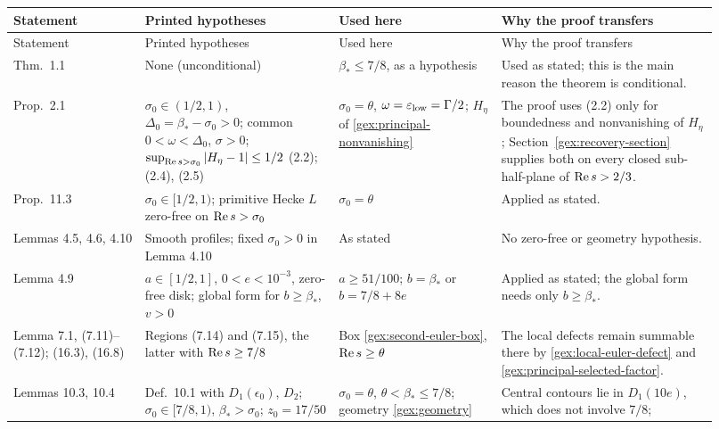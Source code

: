 {\footnotesize
\begin{longtable}{@{}>{\raggedright\arraybackslash}p{0.17\linewidth}
                   >{\raggedright\arraybackslash}p{0.25\linewidth}
                   >{\raggedright\arraybackslash}p{0.21\linewidth}
                   >{\raggedright\arraybackslash}p{0.29\linewidth}@{}}
\toprule
Statement & Printed hypotheses & Used here & Why the proof transfers\\
\midrule
\endfirsthead
\toprule
Statement & Printed hypotheses & Used here & Why the proof transfers\\
\midrule
\endhead
\bottomrule
\endfoot
Thm.\ 1.1
 & None (unconditional)
 & $\beta_*\le7/8$, as a hypothesis
 & Used as stated; this is the main reason the theorem is conditional.\\
\addlinespace[3pt]
Prop.\ 2.1
 & $\sigma_0\in(1/2,1)$, $\Delta_0=\beta_*-\sigma_0>0$;
   common $0<\omega<\Delta_0$, $\sigma>0$;
   $\sup_{\operatorname{Re} s>\sigma_0}|H_\eta-1|\le1/2$ (2.2); (2.4), (2.5)
 & $\sigma_0=\theta$, $\omega=\varepsilon_{\rm low}=\Gamma/2$;
   $H_\eta$ of \eqref{gex:principal-nonvanishing}
 & The proof uses (2.2) only for boundedness and nonvanishing of
   $H_\eta$; Section~\ref{gex:recovery-section} supplies both on every
   closed sub-half-plane of $\operatorname{Re} s>2/3$.\\
\addlinespace[3pt]
Prop.\ 11.3
 & $\sigma_0\in[1/2,1)$; primitive Hecke $L$ zero-free on
   $\operatorname{Re} s>\sigma_0$
 & $\sigma_0=\theta$
 & Applied as stated.\\
\addlinespace[3pt]
Lemmas 4.5, 4.6, 4.10
 & Smooth profiles; fixed $\sigma_0>0$ in Lemma 4.10
 & As stated
 & No zero-free or geometry hypothesis.\\
\addlinespace[3pt]
Lemma 4.9
 & $a\in[1/2,1]$, $0<e<10^{-3}$, zero-free disk; global form for
   $b\ge\beta_*$, $v>0$
 & $a\ge51/100$; $b=\beta_*$ or $b=7/8+8e$
 & Applied as stated; the global form needs only $b\ge\beta_*$.\\
\addlinespace[3pt]
Lemma 7.1, (7.11)--(7.12); (16.3), (16.8)
 & Regions (7.14) and (7.15), the latter with $\operatorname{Re} s\ge7/8$
 & Box \eqref{gex:second-euler-box}, $\operatorname{Re} s\ge\theta$
 & The local defects remain summable there
   by \eqref{gex:local-euler-defect} and
   \eqref{gex:principal-selected-factor}.\\
\addlinespace[3pt]
Lemmas 10.3, 10.4
 & Def.\ 10.1 with $D_1(\epsilon_0)$, $D_2$; $\sigma_0\in[7/8,1)$,
   $\beta_*>\sigma_0$; $z_0=17/50$
 & $\sigma_0=\theta$, $\theta<\beta_*\le7/8$;
   geometry \eqref{gex:geometry}
 & Central contours lie in $D_1(10e)$, which does not involve $7/8$;

\end{longtable}}

